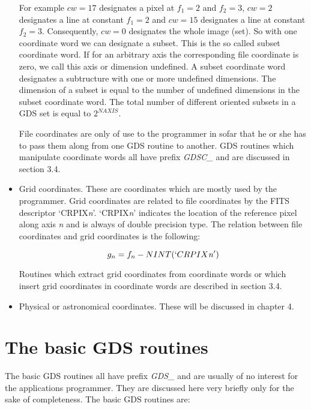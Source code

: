 \begin{itemize}
For example $cw=17$ designates a pixel at $f_1=2$ and $f_2=3$, $cw=2$
designates a line at constant $f_1=2$ and $cw=15$ designates a line at
constant $f_2=3$.  Consequently, $cw=0$ designates the whole image
(set).  So with one coordinate word we can designate a subset.  This is
the so called subset coordinate word.  If for an arbitrary axis the
corresponding file coordinate is zero, we call this axis or dimension
undefined.  A subset coordinate word designates a subtructure with one
or more undefined dimensions.  The dimension of a subset is equal to the
number of undefined dimensions in the subset coordinate word.  The total
number of different oriented subsets in a GDS set is equal to
$2^{NAXIS}$.

File coordinates are only of use to the programmer in sofar that he or
she has to pass them along from one GDS routine to another.  GDS
routines which manipulate coordinate words all have prefix {\sl
GDSC\_\/} and are discussed in section 3.4.

\item Grid coordinates.  These are coordinates which are mostly used by
the programmer.  Grid coordinates are related to file coordinates by the
FITS descriptor `CRPIX{\it n}'.  `CRPIX{\it n}' indicates the location
of the reference pixel along axis {\it n} and is always of double
precision type.  The relation between file coordinates and grid
coordinates is the following:

$$g_n = f_n - NINT(`CRPIX{\it n}')$$

Routines which extract grid coordinates from coordinate words or which
insert grid coordinates in coordinate words are described in section 3.4.

\item Physical or astronomical coordinates.  These will be discussed in
chapter 4.

\end{itemize}

\section{The basic GDS routines}

The basic GDS routines all have prefix {\sl GDS\_\/} and are usually of
no interest for the applications programmer.  They are discussed here
very briefly only for the sake of completeness.  The basic GDS routines
are:

